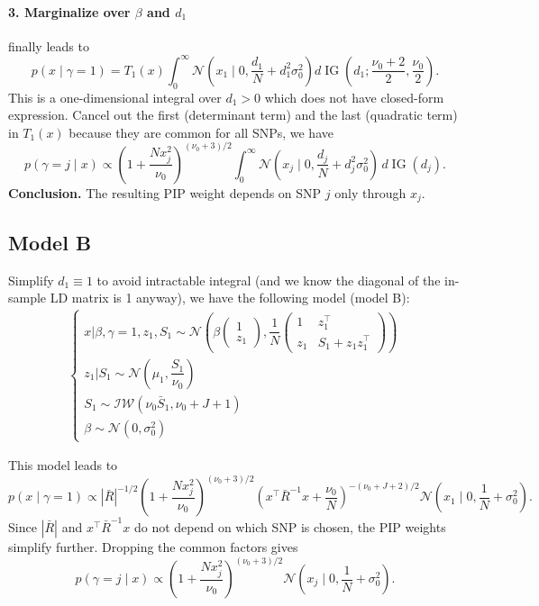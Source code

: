 \documentclass[11pt]{article}
\newcommand{\IG}{\operatorname{IG}}
\newcommand{\Normal}{\mathcal N}
\begin{document}
\paragraph{3. Marginalize over $\beta$ and $d_1$} finally leads to 
\[
\boxed{
p(x\mid \gamma=1)
=
T_1(x)
\int_0^\infty
\Normal\left(x_1\mid 0,\frac{d_1}{N}+d_1^2\sigma_0^2\right)
d\IG\left(d_1;\frac{\nu_0+2}{2},\frac{\nu_0}{2}\right)
}.
\]
This is a one-dimensional integral over $d_1>0$ which does not have closed-form expression. Cancel out the first (determinant term) and the last (quadratic term) in $T_1(x)$ because they are common for all SNPs, we have
\begin{equation}\label{eq:PIP-model-A}
\boxed{
p(\gamma=j\mid x)
\propto
\left(1+\frac{Nx_j^2}{\nu_0}\right)^{(\nu_0+3)/2}
\int_0^\infty
\Normal\left(x_j\mid 0,\frac{d_j}{N}+d_j^2\sigma_0^2\right)\,d \IG(d_j)
}.
\end{equation}
\textbf{Conclusion.} The resulting PIP weight depends on SNP $j$
only through $x_j$.

\subsection{Model B} 
Simplify $d_1 \equiv 1$ to avoid intractable integral (and we know the diagonal of the in-sample LD matrix is 1 anyway), we have the following model (model B):
\begin{align}\label{eq:SER-model-B} 
\begin{cases}
x | \beta, \gamma = 1, z_1, S_1 \sim \mathcal{N}\left(\beta 
\begin{pmatrix}
1  \\
z_1
\end{pmatrix}, 
\dfrac{1}{N} \begin{pmatrix}
1 & z_1^\top \\
z_1 & S_1 + z_1 z_1^\top
\end{pmatrix}\right)\\
z_1 | S_1 \sim \mathcal{N}\left(\mu_1, \dfrac{S_1}{\nu_0}\right)\\
S_1 \sim \mathcal{IW}(\nu_0 \bar S_1, \nu_0 + J + 1)\\
\beta \sim \mathcal{N}(0, \sigma_0^2)
\end{cases}
\end{align}

This model leads to
\[
\boxed{
p(x\mid\gamma=1)
\propto
|\bar R|^{-1/2}
\left(1+\frac{Nx_j^2}{\nu_0}\right)^{(\nu_0+3)/2}
\left(x^\top\bar R^{-1}x+\frac{\nu_0}{N}\right)^{-(\nu_0+J+2)/2}
\Normal\left(x_1\mid 0,\frac{1}{N} + \sigma_0^2\right)
}.
\]
Since $|\bar R|$ and $x^\top\bar R^{-1}x$ do not depend on which SNP is chosen,
the PIP weights simplify further. Dropping the common factors gives
\begin{equation}\label{eq:PIP-model-B}
\boxed{
p(\gamma=j \mid x)
\propto
\left(1+\frac{Nx_j^2}{\nu_0}\right)^{(\nu_0+3)/2}
\Normal\left(x_j \mid 0,\frac{1}{N} + \sigma_0^2\right)
}.
\end{equation}
\end{document}
